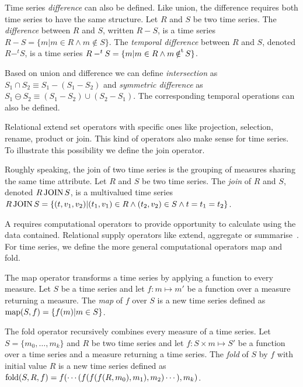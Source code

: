 Time series \emph{difference} can also be defined. Like union, the
difference requires both time series to have the same structure.
%
Let $R$ and $S$ be two time series.
%
The \emph{difference} between $R$ and $S$, written $R-S$, is a time
series $R-S=\{m|m\in R\wedge m\notin S\}$.
%
The \emph{temporal difference} between $R$ and $S$, denoted $R-^t S$, 
is a time series $R-^tS=\{m|m\in R\wedge m \operatorname*{\notin^t} S\}$.


Based on union and difference we can define \emph{intersection} as
$S_1\cap S_2 \equiv S_1 - (S_1 - S_2)$ and \emph{symmetric difference}
as $S_1 \ominus S_2 \equiv (S_1 - S_2) \cup (S_2 - S_1)$. The
corresponding temporal operations can also be defined.


Relational  extend set operators with specific ones like
projection, selection, rename, product or join. This kind of operators
also make sense for time series. To illustrate this possibility we
define the join operator.

Roughly speaking, the join of two time series is the grouping of
measures sharing the same time attribute.  Let $R$ and $S$ be two time
series.  The \emph{join} of $R$ and $S$, denoted $R \operatorname*{JOIN} S$, is a
multivalued time series $R \operatorname*{JOIN} S = \{ (t,v_1,v_2) | (t_1,v_1) \in
R\wedge (t_2,v_2) \in S \wedge t=t_1=t_2 \}$.  


A  requires computational operators to provide opportunity
to calculate using the data contained. Relational  supply
operators like extend, aggregate or
summarise~\cite{date:introduction}. For time series, we define the more
general computational operators map and fold.

The map operator transforms a time series by applying a function to
every measure.  Let $S$ be a time series and let $f:m\mapsto m'$ be a
function over a measure returning a measure. The \emph{map} of $f$
over $S$ is a new time series defined as $\operatorname*{map}(S,f)=\{f(m)|m\in S\}$.

The fold operator recursively combines every measure of a time series.
%
Let $S=\{m_0,\dots, m_k\}$ and $R$ be two time series and let $f:
S\times m \mapsto S'$ be a function over a time series and a measure
returning a time series. 
%
The \emph{fold} of $S$ by $f$ with initial value $R$ is a new time
series defined as $\operatorname*{fold}(S,R,f) = f(\cdots(f(f(f(R,m_0),\allowbreak
m_1),\allowbreak m_2)\cdots),\allowbreak m_k)$.

